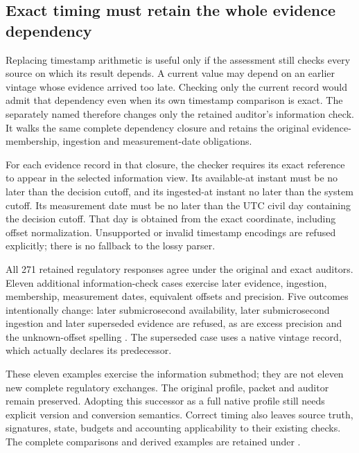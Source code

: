\subsection{Exact timing must retain the whole evidence dependency}
\label{sec:exact-native-information}

Replacing timestamp arithmetic is useful only if the assessment still checks
every source on which its result depends. A current value may depend on an
earlier vintage whose evidence arrived too late. Checking only the current
record would admit that dependency even when its own timestamp comparison is
exact. The separately named  therefore changes
only the retained auditor's information check. It walks the same complete
dependency closure and retains the original evidence-membership, ingestion
and measurement-date obligations.

For each evidence record in that closure, the checker requires its exact
reference to appear in the selected information view. Its available-at instant
must be no later than the decision cutoff, and its ingested-at instant no later
than the system cutoff. Its measurement date must be no later than the UTC
civil day containing the decision cutoff. That day is obtained from the exact
coordinate, including offset normalization. Unsupported or invalid timestamp
encodings are refused explicitly; there is no fallback to the lossy parser.

All 271 retained regulatory responses agree under the original and exact
auditors. Eleven additional information-check cases exercise later evidence,
ingestion, membership, measurement dates, equivalent offsets and precision.
Five outcomes intentionally change: later submicrosecond availability, later
submicrosecond ingestion and later superseded evidence are refused, as are
excess precision and the unknown-offset spelling . The superseded
case uses a native vintage record, which actually declares its predecessor.

These eleven examples exercise the information submethod; they are not eleven
new complete regulatory exchanges. The original profile, packet and auditor
remain preserved. Adopting this successor as a full native profile still needs
explicit version and conversion semantics. Correct timing also leaves source
truth, signatures, state, budgets and accounting applicability to their existing
checks. The complete comparisons and derived examples are retained under
.
